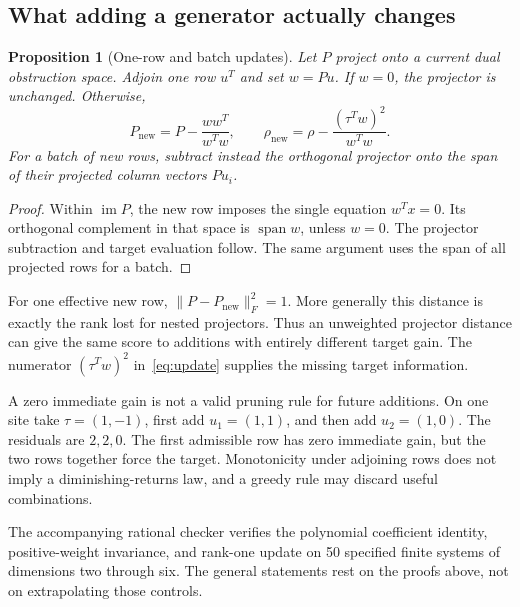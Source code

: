 \documentclass[11pt,letterpaper]{article}
\newtheorem{proposition}[theorem]{Proposition}
\theoremstyle{definition}
\theoremstyle{remark}\newtheorem{remark}[theorem]{Remark}
\begin{document}
\subsection{What adding a generator actually changes}
\begin{proposition}[One-row and batch updates]\label{prop:update}
Let $P$ project onto a current dual obstruction space. Adjoin one row $u^T$ and set $w=Pu$. If $w=0$, the projector is unchanged. Otherwise,
\begin{equation}\label{eq:update}
P_{\mathrm{new}}=P-\frac{ww^T}{w^Tw},\qquad
\rho_{\mathrm{new}}=\rho-\frac{(\tau^Tw)^2}{w^Tw}.
\end{equation}
For a batch of new rows, subtract instead the orthogonal projector onto the span of their projected column vectors $Pu_i$.
\end{proposition}
\begin{proof}
Within $\operatorname{im}P$, the new row imposes the single equation $w^Tx=0$. Its orthogonal complement in that space is $\operatorname{span}w$, unless $w=0$. The projector subtraction and target evaluation follow. The same argument uses the span of all projected rows for a batch.
\end{proof}
For one effective new row, $\|P-P_{\mathrm{new}}\|_F^2=1$. More generally this distance is exactly the rank lost for nested projectors. Thus an unweighted projector distance can give the same score to additions with entirely different target gain. The numerator $(\tau^Tw)^2$ in~\eqref{eq:update} supplies the missing target information.

A zero immediate gain is not a valid pruning rule for future additions. On one site take $\tau=(1,-1)$, first add $u_1=(1,1)$, and then add $u_2=(1,0)$. The residuals are $2,2,0$. The first admissible row has zero immediate gain, but the two rows together force the target. Monotonicity under adjoining rows does not imply a diminishing-returns law, and a greedy rule may discard useful combinations.

The accompanying rational checker verifies the polynomial coefficient identity, positive-weight invariance, and rank-one update on 50 specified finite systems of dimensions two through six. The general statements rest on the proofs above, not on extrapolating those controls.
\end{document}
